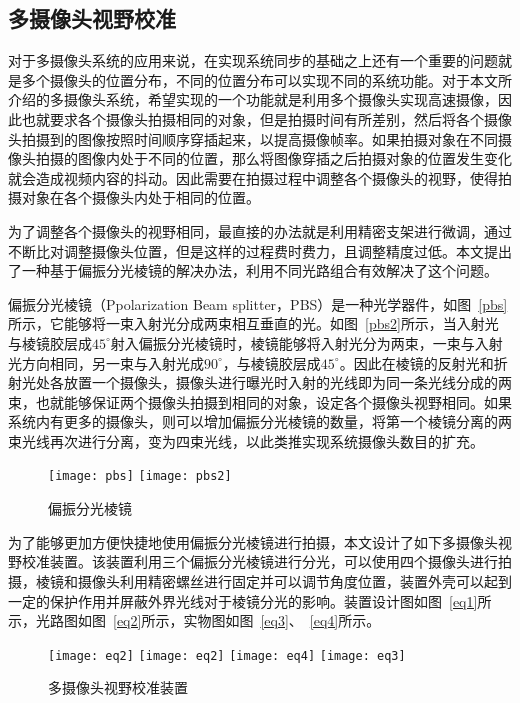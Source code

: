 \subsection{多摄像头视野校准}

对于多摄像头系统的应用来说，在实现系统同步的基础之上还有一个重要的问题就是多个摄像头的位置分布，不同的位置分布可以实现不同的系统功能。对于本文所介绍的多摄像头系统，希望实现的一个功能就是利用多个摄像头实现高速摄像，因此也就要求各个摄像头拍摄相同的对象，但是拍摄时间有所差别，然后将各个摄像头拍摄到的图像按照时间顺序穿插起来，以提高摄像帧率。如果拍摄对象在不同摄像头拍摄的图像内处于不同的位置，那么将图像穿插之后拍摄对象的位置发生变化就会造成视频内容的抖动。因此需要在拍摄过程中调整各个摄像头的视野，使得拍摄对象在各个摄像头内处于相同的位置。

为了调整各个摄像头的视野相同，最直接的办法就是利用精密支架进行微调，通过不断比对调整摄像头位置，但是这样的过程费时费力，且调整精度过低。本文提出了一种基于偏振分光棱镜的解决办法，利用不同光路组合有效解决了这个问题。

偏振分光棱镜（Ppolarization Beam splitter，PBS）是一种光学器件，如图~\ref{pbs}所示，它能够将一束入射光分成两束相互垂直的光。如图~\ref{pbs2}所示，当入射光与棱镜胶层成$45^{\circ}$射入偏振分光棱镜时，棱镜能够将入射光分为两束，一束与入射光方向相同，另一束与入射光成$90^{\circ}$，与棱镜胶层成$45^{\circ}$。因此在棱镜的反射光和折射光处各放置一个摄像头，摄像头进行曝光时入射的光线即为同一条光线分成的两束，也就能够保证两个摄像头拍摄到相同的对象，设定各个摄像头视野相同。如果系统内有更多的摄像头，则可以增加偏振分光棱镜的数量，将第一个棱镜分离的两束光线再次进行分离，变为四束光线，以此类推实现系统摄像头数目的扩充。

\begin{figure}[h]
  \centering%
    {\texttt{[image: pbs]}}
      {\texttt{[image: pbs2]}}
  \caption{偏振分光棱镜}
\end{figure}

为了能够更加方便快捷地使用偏振分光棱镜进行拍摄，本文设计了如下多摄像头视野校准装置。该装置利用三个偏振分光棱镜进行分光，可以使用四个摄像头进行拍摄，棱镜和摄像头利用精密螺丝进行固定并可以调节角度位置，装置外壳可以起到一定的保护作用并屏蔽外界光线对于棱镜分光的影响。装置设计图如图~\ref{eq1}所示，光路图如图~\ref{eq2}所示，实物图如图~\ref{eq3}、~\ref{eq4}所示。

\begin{figure}[h]
  \centering%
    {\texttt{[image: eq2]}}
      {\texttt{[image: eq2]}}
      {\texttt{[image: eq4]}}
      {\texttt{[image: eq3]}}
  \caption{多摄像头视野校准装置}
\end{figure}

